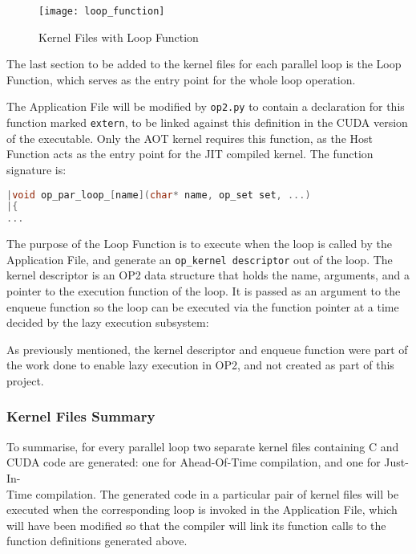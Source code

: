 \clearpage

\begin{wrapfigure}{r}{.33\textwidth}
  \centering
  \caption{Kernel Files with Loop Function}
  \label{fig:loop_func}
  \texttt{[image: loop\_function]}
\end{wrapfigure}
The last section to be added to the kernel files for each parallel loop is the Loop Function, which serves as the entry point for the whole loop operation.
 \par
The Application File will be modified by \verb|op2.py| to contain a declaration for this function marked \verb|extern|, to be linked against this definition in the CUDA version of the executable. Only the AOT kernel requires this function, as the Host Function acts as the entry point for the JIT compiled kernel. The function signature is:
\begin{lstlisting}[backgroundcolor=\color{blue!20}, language=C]
|void op_par_loop_[name](char* name, op_set set, ...)
|{
...
\end{lstlisting}
\par
\noindent The purpose of the Loop Function is to execute when the loop is called by the Application File, and generate an \verb|op_kernel descriptor| out of the loop. The kernel descriptor is an OP2 data structure that holds the name, arguments, and a pointer to the execution function of the loop. It is passed as an argument to the enqueue function so the loop can be executed via the function pointer at a time decided by the lazy execution subsystem:

\noindent As previously mentioned, the kernel descriptor and enqueue function were part of the work done to enable lazy execution in OP2, and not created as part of this project.

\clearpage

\subsubsection{Kernel Files Summary}
\label{impl_summary}

To summarise, for every parallel loop two separate kernel files containing C and CUDA code are generated: one for Ahead-Of-Time compilation, and one for Just-In-\\Time compilation. The generated code in a particular pair of kernel files will be executed when the corresponding loop is invoked in the Application File, which will have been modified so that the compiler will link its function calls to the function definitions generated above.

